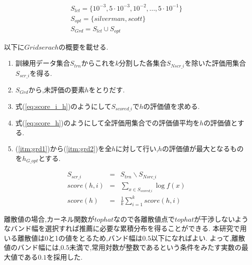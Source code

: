 \begin{gather}
\label{eq:kde_lct}
S_{lct}=\{10^{-3},5\cdot 10^{-3},10^{-2},...,5\cdot 10^{-1}\} \\
\label{eq:kde_opt}
S_{opt}=\{silverman,scott\} \\
\label{eq:kde_search}
S_{Grd}=S_{lct}\cup S_{opt}
\end{gather}

以下に$Gridserach$の概要を載せる.
\begin{enumerate}
  \item 訓練用データ集合$S_{trn}$からこれを$k$分割した各集合$S_{Nscr\_i}$を除いた評価用集合$S_{scr\_i}$を得る.
  \item $S_{Grd}$から,未評価の要素$h$をとりだす.
  \label{itm:grd1}
  \item 式(\ref{eq:score_i_h})のようにして$S_{scored\_i}$で$h$の評価値を求める.
  \item 式(\ref{eq:score_h})のようにして全評価用集合での評価値平均を$h$の評価値とする.
  \label{itm:grd2}
\item (\ref{itm:grd1})から(\ref{itm:grd2})を全$h$に対して行い,$h$の評価値が最大となるものを$h_{G\_opt}$とする.
\end{enumerate}
\begin{eqnarray}
  \label{eq:trn_data}
  S_{scr\_i}&=&S_{trn}\backslash S_{Nsrc\_i} \\
  \label{eq:score_i_h}
  score(h,i)&=&\sum_{x\in S_{scored\_i}}\log f(x) \\
  \label{eq:score_h}
  score(h)&=&\frac{1}{k}\sum_{i=1}^k score(h,i)
\end{eqnarray}
\par
離散値の場合,カーネル関数が$tophat$なので各離散値点で$tophat$が干渉しないようなバンド幅を選択すれば推薦に必要な累積分布を得ることができる.
本研究で用いる離散値は0と1の値をとるため,バンド幅は$0.5$以下になればよい.
よって,離散値のバンド幅には,$0.5$未満で,常用対数が整数であるという条件をみたす実数の最大値である$0.1$を採用した.


